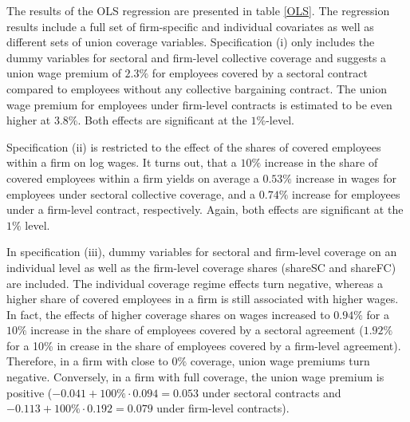 The results of the OLS regression are presented in table \ref{OLS}. The regression results include a full set of firm-specific and individual covariates as well as different sets of union coverage variables. Specification (i) only includes the dummy variables for sectoral and firm-level collective coverage and suggests a union wage premium of $2.3\%$ for employees covered by a sectoral contract compared to employees without any collective bargaining contract. The union wage premium for employees under firm-level contracts is estimated to be even higher at $3.8\%$. Both effects are significant at the $1\%$-level.

Specification (ii) is restricted to the effect of the shares of covered employees within a firm on log wages. It turns out, that a $10\%$ increase in the share of covered employees within a firm yields on average a $0.53\%$ increase in wages for employees under sectoral collective coverage, and a $0.74\%$ increase for employees under a firm-level contract, respectively. Again, both effects are significant at the $1\%$ level.

In specification (iii), dummy variables for sectoral and firm-level coverage on an individual level as well as the firm-level coverage shares (shareSC and shareFC) are included. The individual coverage regime effects turn negative, whereas a higher share of covered employees in a firm is still associated with higher wages. In fact, the effects of higher coverage shares on wages increased to $0.94\%$ for a $10\%$ increase in the share of employees covered by a sectoral agreement ($1.92\%$ for a 10\% in crease in the share of employees covered by a firm-level agreement). Therefore, in a firm with close to $0\%$ coverage, union wage premiums turn negative. Conversely, in a firm with full coverage, the union wage premium is positive ($-0.041+100\% \cdot 0.094=0.053$ under sectoral contracts and $-0.113 +100\% \cdot 0.192=0.079$ under firm-level contracts).

